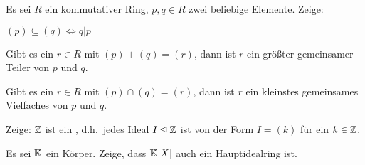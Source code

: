 \begin{sheet}
\begin{problem}[title={Ideale vs. Teilbarkeit}]
        Es sei $R$ ein kommutativer Ring, $p,q\in R$ zwei beliebige Elemente. Zeige:
        \begin{subproblem}
            $(p) \subseteq (q) \iff q | p$
        \end{subproblem}

        \begin{subproblem}
            Gibt es ein $r\in R$ mit $(p) + (q) = (r)$, dann ist $r$ ein größter gemeinsamer Teiler von $p$ und $q$.
        \end{subproblem}
        \begin{subproblem}
            Gibt es ein $r\in R$ mit $(p) \cap (q) = (r)$, dann ist $r$ ein kleinstes gemeinsames Vielfaches von $p$ und $q$.
        \end{subproblem}
    \end{problem}

    \begin{problem}
        Zeige: $\mathbb{Z}$ ist ein , d.h.\ jedes Ideal $I\unlhd\mathbb{Z}$ ist von der Form $I=(k)$ für ein $k\in\mathbb{Z}$.
    \end{problem}
    \begin{problem}
        Es sei $\mathbb{K}$ ein Körper. Zeige, dass $\mathbb{K}[X]$ auch ein Hauptidealring ist.
    \end{problem}
\end{sheet}